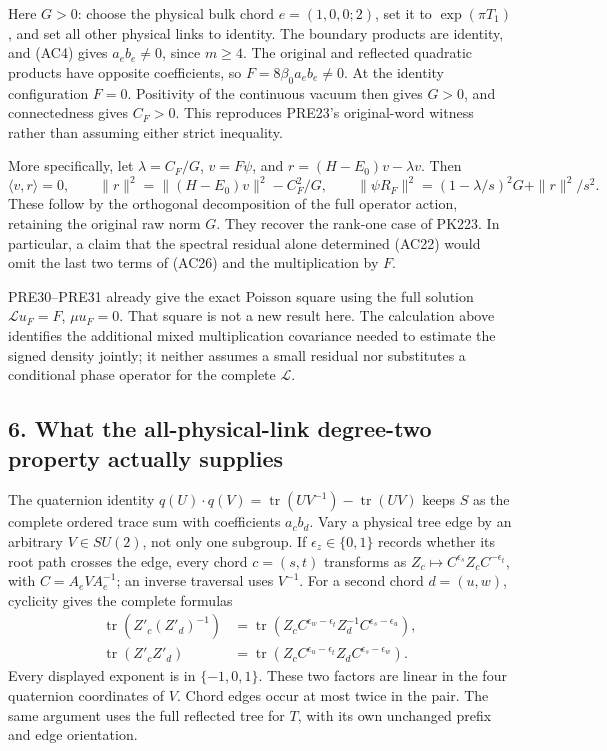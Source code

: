 \documentclass[11pt]{article}
\begin{document}
Here \(G>0\): choose the physical bulk chord \(e=(1,0,0;2)\), set it to \(\exp(\pi T_1)\), and set all other physical links to identity. The boundary products are identity, and (AC4) gives \(a_e b_e\ne0\), since \(m\ge4\). The original and reflected quadratic products have opposite coefficients, so \(F=8\beta_0a_eb_e\ne0\). At the identity configuration \(F=0\). Positivity of the continuous vacuum then gives \(G>0\), and connectedness gives \(C_F>0\). This reproduces PRE23's original-word witness rather than assuming either strict inequality.

More specifically, let \(\lambda=C_F/G\), \(v=F\psi\), and \(r=(H-E_0)v-\lambda v\). Then
\[
 \langle v,r\rangle=0,\qquad
 \|r\|^2=\|(H-E_0)v\|^2-C_F^2/G,\qquad
 \|\psi R_F\|^2=(1-\lambda/s)^2G+\|r\|^2/s^2.
 \tag{AC27}
\]
These follow by the orthogonal decomposition of the full operator action, retaining the original raw norm \(G\). They recover the rank-one case of PK223. In particular, a claim that the spectral residual alone determined (AC22) would omit the last two terms of (AC26) and the multiplication by \(F\).

PRE30–PRE31 already give the exact Poisson square using the full solution \(\mathcal Lu_F=F\), \(\mu u_F=0\). That square is not a new result here. The calculation above identifies the additional mixed multiplication covariance needed to estimate the signed density jointly; it neither assumes a small residual nor substitutes a conditional phase operator for the complete \(\mathcal L\).

\subsection*{6. What the all-physical-link degree-two property actually supplies}

The quaternion identity
\(q(U)\cdot q(V)=\operatorname{tr}(UV^{-1})-\operatorname{tr}(UV)\)
keeps \(S\) as the complete ordered trace sum with coefficients \(a_cb_d\). Vary a physical tree edge by an arbitrary \(V\in SU(2)\), not only one subgroup. If \(\epsilon_z\in\{0,1\}\) records whether its root path crosses the edge, every chord \(c=(s,t)\) transforms as \(Z_c\mapsto C^{\epsilon_s}Z_cC^{-\epsilon_t}\), with \(C=A_eVA_e^{-1}\); an inverse traversal uses \(V^{-1}\). For a second chord \(d=(u,w)\), cyclicity gives the complete formulas
\[
\begin{aligned}
\operatorname{tr}(Z'_c(Z'_d)^{-1})
 &=\operatorname{tr}(Z_c C^{\epsilon_w-\epsilon_t}Z_d^{-1}
                         C^{\epsilon_s-\epsilon_u}),\\
\operatorname{tr}(Z'_cZ'_d)
 &=\operatorname{tr}(Z_c C^{\epsilon_u-\epsilon_t}Z_d
                         C^{\epsilon_s-\epsilon_w}).
\end{aligned}
\]
Every displayed exponent is in \(\{-1,0,1\}\). These two factors are linear in the four quaternion coordinates of \(V\). Chord edges occur at most twice in the pair. The same argument uses the full reflected tree for \(T\), with its own unchanged prefix and edge orientation.
\end{document}
